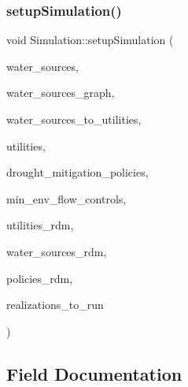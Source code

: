 \mbox{\label{classSimulation_ac9ff965191f13b1ce044344fd1e5d0ac_ac9ff965191f13b1ce044344fd1e5d0ac}} 
\subsubsection{\texorpdfstring{setup\+Simulation()}{setupSimulation()}}
{\footnotesize\ttfamily void Simulation\+::setup\+Simulation (\begin{DoxyParamCaption}\item[{vector$<$ \mbox{\hyperlink{classWaterSource}{Water\+Source}} $\ast$$>$ \&}]{water\+\_\+sources,  }\item[{\mbox{\hyperlink{classGraph}{Graph}} \&}]{water\+\_\+sources\+\_\+graph,  }\item[{const vector$<$ vector$<$ int $>$$>$ \&}]{water\+\_\+sources\+\_\+to\+\_\+utilities,  }\item[{vector$<$ \mbox{\hyperlink{classUtility}{Utility}} $\ast$$>$ \&}]{utilities,  }\item[{const vector$<$ \mbox{\hyperlink{classDroughtMitigationPolicy}{Drought\+Mitigation\+Policy}} $\ast$$>$ \&}]{drought\+\_\+mitigation\+\_\+policies,  }\item[{vector$<$ \mbox{\hyperlink{classMinEnvFlowControl}{Min\+Env\+Flow\+Control}} $\ast$$>$ \&}]{min\+\_\+env\+\_\+flow\+\_\+controls,  }\item[{vector$<$ vector$<$ double $>$$>$ \&}]{utilities\+\_\+rdm,  }\item[{vector$<$ vector$<$ double $>$$>$ \&}]{water\+\_\+sources\+\_\+rdm,  }\item[{vector$<$ vector$<$ double $>$$>$ \&}]{policies\+\_\+rdm,  }\item[{vector$<$ unsigned long $>$ \&}]{realizations\+\_\+to\+\_\+run }\end{DoxyParamCaption})}



\subsection{Field Documentation}
\mbox{\label{classSimulation_a23df9c17244a1cde0e32b42829623724_a23df9c17244a1cde0e32b42829623724}} 
